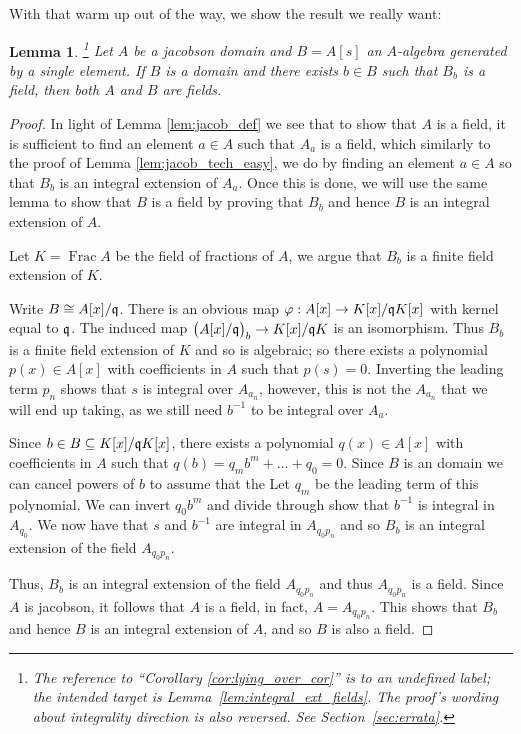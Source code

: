 \documentclass[12pt]{article}
\theoremstyle{plain}
\newtheorem{lemma}[thm]{Lemma}
\theoremstyle{definition}
\begin{document}
With that warm up out of the way, we show the result we really want:
\begin{lemma}\label{lem:jacob_tech_hard}\footnote{The reference to ``Corollary \ref{cor:lying_over_cor}'' is to an undefined label; the intended target is Lemma~\ref{lem:integral_ext_fields}. The proof's wording about integrality direction is also reversed. See Section~\ref{sec:errata}.}
Let $A$ be a jacobson domain and $B = A[s]$ an $A$-algebra generated by a single element. If $B$ is a domain and there exists $b \in B$ such that $B_b$ is a field, then both $A$ and $B$ are fields.
\end{lemma}
\begin{proof}
In light of Lemma \ref{lem:jacob_def} we see that to show that $A$ is a field, it is sufficient to find an element $a \in A$ such that $A_a$ is a field, which similarly to the proof of Lemma \ref{lem:jacob_tech_easy}, we do by finding an element $a \in A$ so that $B_b$ is an integral extension of $A_a$. Once this is done, we will use the same lemma to show that $B$ is a field by proving that $B_b$ and hence $B$ is an integral extension of $A$.

Let $K = \operatorname{Frac}A$ be the field of fractions of $A$, we argue that $B_b$ is a finite field extension of $K$.

Write $B \cong A[x]/\frak{q}$. There is an obvious map $\varphi: A[x] \to K[x]/\frak{q}K[x]$ with kernel equal to $\frak{q}$. The induced map $\big(A[x]/\frak{q}\big)_b \to K[x]/\frak{q}K$ is an isomorphism. Thus $B_b$ is a finite field extension of $K$ and so is algebraic; so there exists a polynomial $p(x) \in A[x]$ with coefficients in $A$ such that $p(s) = 0$. Inverting the leading term $p_{n}$ shows that $s$ is integral over $A_{a_n}$, however, this is not the $A_{a_n}$ that we will end up taking, as we still need $b^{-1}$ to be integral over $A_{a}$.

Since $b \in B \subseteq K[x]/\frak{q}K[x]$, there exists a polynomial $q(x) \in A[x]$ with coefficients in $A$ such that $q(b) = q_mb^m + \hdots + q_0 = 0$. Since $B$ is an domain we can cancel powers of $b$ to assume that the Let $q_{m}$ be the leading term of this polynomial. We can invert $q_{0}b^m$ and divide through show that $b^{-1}$ is integral in $A_{q_0}$. We now have that $s$ and $b^{-1}$ are integral in $A_{q_0p_n}$ and so $B_b$ is an integral extension of the field $A_{q_0p_n}$.

Thus, $B_b$ is an integral extension of the field $A_{q_0p_n}$ and thus $A_{q_0p_n}$ is a field. Since $A$ is jacobson, it follows that $A$ is a field, in fact, $A = A_{q_0p_n}$. This shows that $B_b$ and hence $B$ is an integral extension of $A$, and so $B$ is also a field. 
\end{proof}
\end{document}
